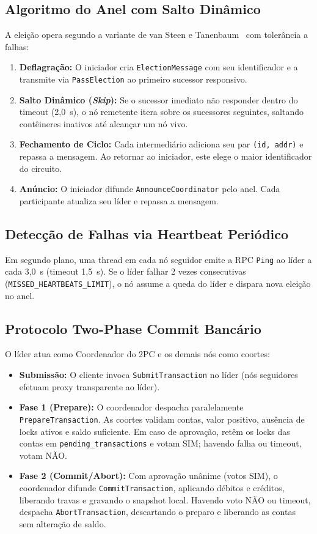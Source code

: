 \documentclass[conference]{IEEEtran}
\begin{document}
\subsection{Algoritmo do Anel com Salto Dinâmico}
A eleição opera segundo a variante de van Steen e Tanenbaum~\cite{vsteen} com tolerância a falhas:
\begin{enumerate}
  \item \textbf{Deflagração:} O iniciador cria \texttt{ElectionMessage} com seu identificador e a transmite via \texttt{PassElection} ao primeiro sucessor responsivo.
  \item \textbf{Salto Dinâmico (\textit{Skip}):} Se o sucessor imediato não responder dentro do timeout (2,0~s), o nó remetente itera sobre os sucessores seguintes, saltando contêineres inativos até alcançar um nó vivo.
  \item \textbf{Fechamento de Ciclo:} Cada intermediário adiciona seu par \texttt{(id, addr)} e repassa a mensagem. Ao retornar ao iniciador, este elege o maior identificador do circuito.
  \item \textbf{Anúncio:} O iniciador difunde \texttt{AnnounceCoordinator} pelo anel. Cada participante atualiza seu líder e repassa a mensagem.
\end{enumerate}

\subsection{Detecção de Falhas via Heartbeat Periódico}
Em segundo plano, uma thread em cada nó seguidor emite a RPC \texttt{Ping} ao líder a cada 3,0~s (timeout 1,5~s). Se o líder falhar 2 vezes consecutivas (\texttt{MISSED\_HEARTBEATS\_LIMIT}), o nó assume a queda do líder e dispara nova eleição no anel.

\subsection{Protocolo Two-Phase Commit Bancário}
O líder atua como Coordenador do 2PC e os demais nós como coortes:
\begin{itemize}
  \item \textbf{Submissão:} O cliente invoca \texttt{SubmitTransaction} no líder (nós seguidores efetuam proxy transparente ao líder).
  \item \textbf{Fase 1 (Prepare):} O coordenador despacha paralelamente \texttt{PrepareTransaction}. As coortes validam contas, valor positivo, ausência de locks ativos e saldo suficiente. Em caso de aprovação, retêm os locks das contas em \texttt{pending\_transactions} e votam SIM; havendo falha ou timeout, votam NÃO.
  \item \textbf{Fase 2 (Commit/Abort):} Com aprovação unânime (votos SIM), o coordenador difunde \texttt{CommitTransaction}, aplicando débitos e créditos, liberando travas e gravando o snapshot local. Havendo voto NÃO ou timeout, despacha \texttt{AbortTransaction}, descartando o preparo e liberando as contas sem alteração de saldo.
\end{itemize}
\end{document}
